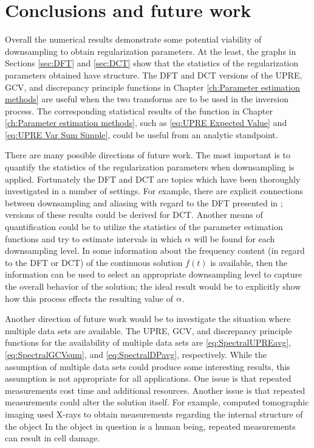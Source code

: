 \chapter{Conclusions and future work} \label{ch:Conclusion}
Overall the numerical results demonstrate some potential viability of downsampling to obtain regularization parameters. At the least, the graphs in Sections \ref{sec:DFT} and \ref{sec:DCT} show that the statistics of the regularization parameters obtained have structure. The DFT and DCT versions of the UPRE, GCV, and discrepancy principle functions in Chapter \ref{ch:Parameter estimation methods} are useful when the two transforms are to be used in the inversion process. The corresponding statistical results of the function in Chapter \ref{ch:Parameter estimation methods}, such as \eqref{eq:UPRE Expected Value} and \eqref{eq:UPRE Var Sum Simple}, could be useful from an analytic standpoint. \par 
There are many possible directions of future work. The most important is to quantify the statistics of the regularization parameters when downsampling is applied. Fortunately the DFT and DCT are topics which have been thoroughly investigated in a number of settings. For example, there are explicit connections between downsampling and aliasing with regard to the DFT presented in \cite[Ch.~7]{AudioDFT}; versions of these results could be derived for DCT.  Another means of quantification could be to utilize the statistics of the parameter estimation functions and try to estimate intervals in which $\alpha$ will be found for each downsampling level. In some information about the frequency content (in regard to the DFT or DCT) of the continuous solution $f(t)$ is available, then the information can be used to select an appropriate downsampling level to capture the overall behavior of the solution; the ideal result would be to explicitly show how this process effects the resulting value of $\alpha$. \par 
Another direction of future work would be to investigate the situation where multiple data sets are available. The UPRE, GCV, and discrepancy principle functions for the availability of multiple data sets are \eqref{eq:SpectralUPREavg}, \eqref{eq:SpectralGCVsum}, and \eqref{eq:SpectralDPavg}, respectively. While the assumption of multiple data sets could produce some interesting results, this assumption is not appropriate for all applications. One issue is that repeated measurements cost time and additional resources. Another issue is that repeated measurements could alter the solution itself. For example, computed tomographic imaging used X-rays to obtain measurements regarding the internal structure of the object \cite[p.~12-14]{ABT} In the object in question is a human being, repeated measurements can result in cell damage. \par 
